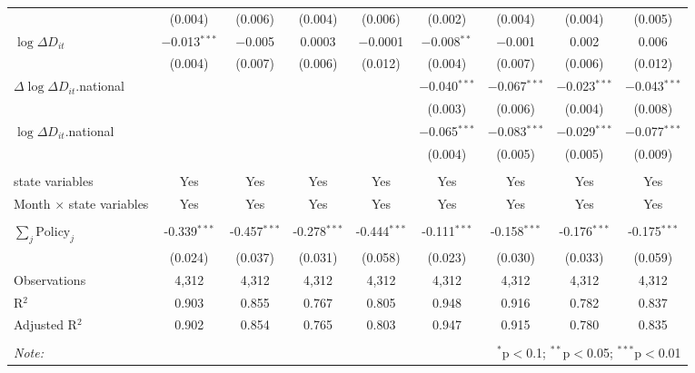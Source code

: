 \begin{tabular}{@{\extracolsep{1pt}}lcccccccc}
  & (0.004) & (0.006) & (0.004) & (0.006) & (0.002) & (0.004) & (0.004) & (0.005) \\ 
  $\log \Delta D_{it}$ & $-$0.013$^{***}$ & $-$0.005 & 0.0003 & $-$0.0001 & $-$0.008$^{**}$ & $-$0.001 & 0.002 & 0.006 \\ 
  & (0.004) & (0.007) & (0.006) & (0.012) & (0.004) & (0.007) & (0.006) & (0.012) \\ 
  $\Delta \log \Delta D_{it}$.national &  &  &  &  & $-$0.040$^{***}$ & $-$0.067$^{***}$ & $-$0.023$^{***}$ & $-$0.043$^{***}$ \\ 
  &  &  &  &  & (0.003) & (0.006) & (0.004) & (0.008) \\ 
  $\log \Delta D_{it}$.national &  &  &  &  & $-$0.065$^{***}$ & $-$0.083$^{***}$ & $-$0.029$^{***}$ & $-$0.077$^{***}$ \\ 
  &  &  &  &  & (0.004) & (0.005) & (0.005) & (0.009) \\ 
 \hline \\[-1.8ex] 
state variables & Yes & Yes & Yes & Yes & Yes & Yes & Yes & Yes \\ 
Month $\times$ state variables & Yes & Yes & Yes & Yes & Yes & Yes & Yes & Yes \\ 
\hline \\[-1.8ex] 
$\sum_j \mathrm{Policy}_j$ & -0.339$^{***}$ & -0.457$^{***}$ & -0.278$^{***}$ & -0.444$^{***}$ & -0.111$^{***}$ & -0.158$^{***}$ & -0.176$^{***}$ & -0.175$^{***}$ \\ 
 & (0.024) & (0.037) & (0.031) & (0.058) & (0.023) & (0.030) & (0.033) & (0.059) \\ 
Observations & 4,312 & 4,312 & 4,312 & 4,312 & 4,312 & 4,312 & 4,312 & 4,312 \\ 
R$^{2}$ & 0.903 & 0.855 & 0.767 & 0.805 & 0.948 & 0.916 & 0.782 & 0.837 \\ 
Adjusted R$^{2}$ & 0.902 & 0.854 & 0.765 & 0.803 & 0.947 & 0.915 & 0.780 & 0.835 \\ 
\hline 
\hline \\[-1.8ex] 
\textit{Note:}  & \multicolumn{8}{r}{$^{*}$p$<$0.1; $^{**}$p$<$0.05; $^{***}$p$<$0.01} \\ 
\end{tabular} 